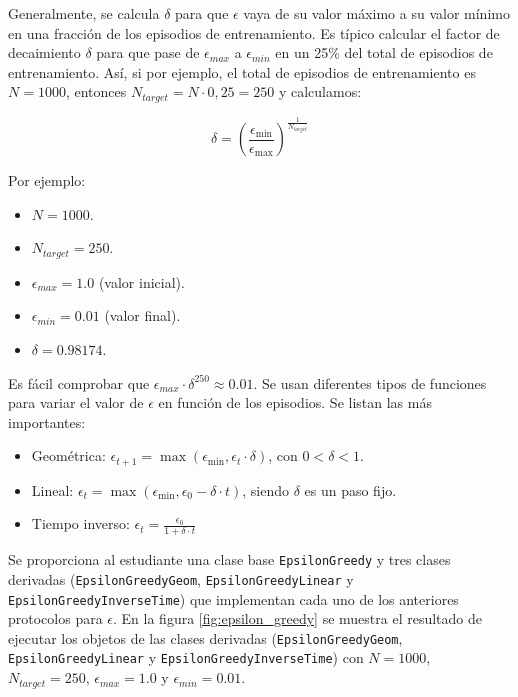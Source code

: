 \documentclass{article}
\begin{document}
Generalmente, se calcula $\delta$ para que $\epsilon$ vaya de su valor máximo a su valor mínimo en una fracción de los episodios de entrenamiento. Es típico calcular el factor de decaimiento $\delta$ para que pase de $\epsilon_{max}$ a $\epsilon_{min}$ en un 25\% del total de episodios de entrenamiento. Así, si por ejemplo, el total de episodios de entrenamiento es $N=1000$, entonces $N_{target}=N\cdot 0,25=250$ y calculamos:

$$\delta = \left(\frac{\epsilon_{\text{min}}}{\epsilon_{\text{max}}} \right)^{\frac{1}{N_{target}}}$$

Por ejemplo:
\begin{itemize}
    \item $N=1000$.
    \item $N_{target}=250$.
    \item $\epsilon_{max}=1.0$ (valor inicial).
    \item $\epsilon_{min}=0.01$ (valor final).
    \item $\delta=0.98174$.
\end{itemize}
Es fácil comprobar que $\epsilon_{max}\cdot \delta^{250}\approx 0.01$. Se usan diferentes tipos de funciones para variar el valor de $\epsilon$ en función de los episodios. Se listan las más importantes:
\begin{itemize}
    \item Geométrica: $\epsilon_{t+1} = \max(\epsilon_{\min}, \epsilon_t \cdot \delta)$, con $0 < \delta < 1$. 
    \item Lineal: $\epsilon_t = \max(\epsilon_{\min}, \epsilon_0 - \delta \cdot t)$, siendo $\delta$ es un paso fijo. 
    \item Tiempo inverso: $\epsilon_t = \frac{\epsilon_0}{1 + \delta \cdot t}$ 
\end{itemize}

Se proporciona al estudiante una clase base \texttt{EpsilonGreedy} y tres clases derivadas (\texttt{EpsilonGreedyGeom}, \texttt{EpsilonGreedyLinear} y \texttt{EpsilonGreedyInverseTime}) que implementan cada uno de los anteriores protocolos para $\epsilon$. En la figura \ref{fig:epsilon_greedy} se muestra el resultado de ejecutar los objetos de las clases derivadas (\texttt{EpsilonGreedyGeom}, \texttt{EpsilonGreedyLinear} y \texttt{EpsilonGreedyInverseTime}) con $N=1000$, $N_{target}=250$, $\epsilon_{max}=1.0$ y $\epsilon_{min}=0.01$.
\end{document}
